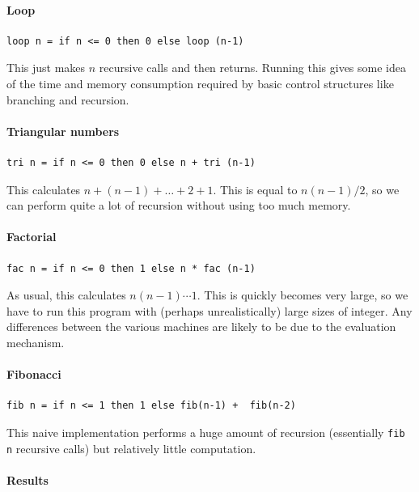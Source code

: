 \documentclass[a4paper]{article}
\begin{document}
\paragraph{Loop}
\begin{verbatim}
loop n = if n <= 0 then 0 else loop (n-1)
\end{verbatim}

\noindent This just makes $n$ recursive calls and then returns.
Running this gives some idea of the time and memory consumption
required by basic control structures like branching and recursion.

\paragraph{Triangular numbers}
\begin{verbatim}
tri n = if n <= 0 then 0 else n + tri (n-1)
\end{verbatim}

\noindent This calculates $n + (n-1) + \ldots + 2 + 1$.  This is equal to
$n(n-1)/2$, so we can perform quite a lot of recursion without using too much memory.

\paragraph{Factorial}
\begin{verbatim}
fac n = if n <= 0 then 1 else n * fac (n-1)
\end{verbatim}

\noindent As usual, this calculates $n(n-1)\cdots1$.  This is quickly
becomes very large, so we have to run this program with (perhaps
unrealistically) large sizes of integer.  Any differences between the
various machines are likely to be due to the evaluation mechanism.

\paragraph{Fibonacci}
\begin{verbatim}
fib n = if n <= 1 then 1 else fib(n-1) +  fib(n-2)
\end{verbatim}

\noindent This naive implementation performs a huge amount of
recursion (essentially \texttt{fib n} recursive calls) but relatively
little computation.

\paragraph{Results}
\end{document}
